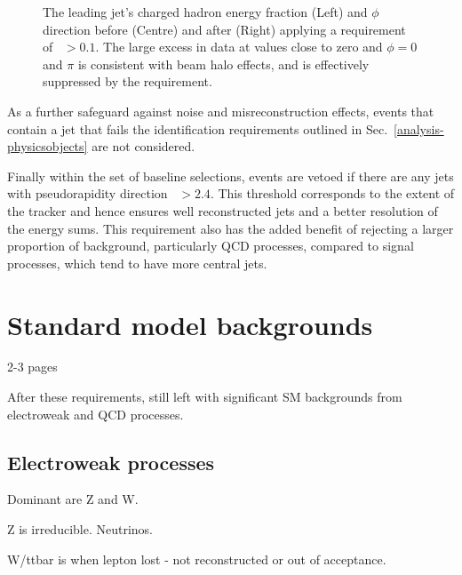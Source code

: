 \begin{figure}
\begin{center}
\caption{The leading jet's charged hadron energy fraction (Left) and $\phi$ 
direction before (Centre) and after (Right) applying a requirement of 
\chf~$>0.1$. The large excess in data at \chf values close to zero and $\phi = 
0$ and $\pi$ is consistent with beam halo effects, and is effectively 
suppressed by the \chf requirement.}
\label{fig:beamhalo}
\end{center}
\end{figure}

As a further safeguard against noise and misreconstruction effects, events that 
contain a jet that fails the identification requirements outlined in 
Sec.~\ref{analysis-physicsobjects} are not considered.

Finally within the set of baseline selections, events are vetoed if there are 
any jets with pseudorapidity direction \etaabs~$>2.4$. This threshold 
corresponds to the extent of the tracker and hence ensures well reconstructed 
jets and a better resolution of the energy sums. This requirement also has the 
added benefit of rejecting a larger proportion of background, particularly QCD 
processes, compared to signal processes, which tend to have more central 
jets.

\section{Standard model backgrounds}
2-3 pages

After these requirements, still left with significant SM backgrounds from 
electroweak and QCD processes.

\subsection{Electroweak processes}

Dominant are Z and W.
	
Z is irreducible. Neutrinos.
	
W/ttbar is when lepton lost - not reconstructed or out of acceptance.

